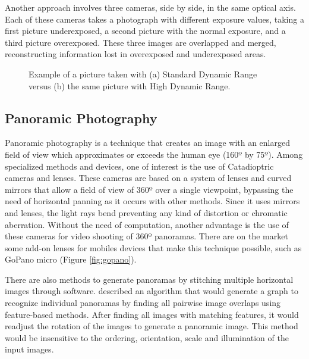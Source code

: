 Another approach \cite{vavilin2011fast} involves three cameras, side by side, in the same optical axis. Each of these cameras takes a photograph with different exposure values, taking a first picture underexposed, a second picture with the normal exposure, and a third picture overexposed. These three images are overlapped and merged, reconstructing information lost in overexposed and underexposed areas.

\begin{figure}[htbp]
        \centering
  \caption{Example of a picture taken with (a) Standard Dynamic Range versus (b) the same picture with High Dynamic Range.}
  \label{fig:hdr_example}
\end{figure}


\subsection{Panoramic Photography}

Panoramic photography is a technique that creates an image with an enlarged field of view which approximates or exceeds the human eye (160º by 75º). Among specialized methods and devices, one of interest is the use of Catadioptric cameras and lenses. These cameras are based on a system of lenses and curved mirrors that allow a field of view of 360º over a single viewpoint, bypassing the need of horizontal panning as it occurs with other methods. Since it uses mirrors and lenses, the light rays bend preventing any kind of distortion or chromatic aberration. Without the need of computation, another advantage is the use of these cameras for video shooting of 360º panoramas. 
There are on the market some add-on lenses for mobiles devices that make this technique possible, such as GoPano micro (Figure \ref{fig:gopano}).

There are also methods to generate panoramas by stitching multiple horizontal images through software.
\citeauthor{brown2007automatic} \cite{brown2007automatic} described an algorithm that would generate a graph to recognize individual panoramas by finding all pairwise image overlaps using feature-based methods. After finding all images with matching features, it would readjust the rotation of the images to generate a panoramic image. This method would be insensitive to the ordering, orientation, scale and illumination of the input images.

